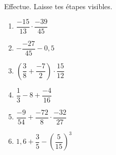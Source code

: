 %
%
    Effectue. Laisse tes étapes visibles.
    \begin{enumerate}[cols=3]
        \item $\dfrac{-15}{13} \cdot \dfrac{-39}{45}$
        \item $-\dfrac{-27}{45} - 0,5$
        \item $\left(\dfrac{3}{8} + \dfrac{-7}{2}\right)\cdot \dfrac{15}{12}$
        \item $\dfrac{1}{3}-8+\dfrac{-4}{16}$
        \item $\dfrac{-9}{54} + \dfrac{-72}{8} \cdot \dfrac{-32}{27}$
        \item $1,6 + \dfrac{3}{5} - \left(\dfrac{5}{15}\right)^3$
    \end{enumerate}
